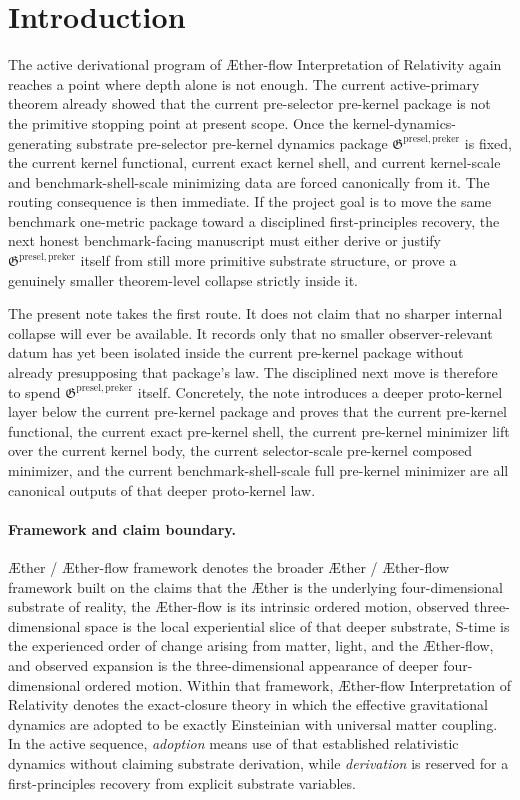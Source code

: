 \documentclass[11pt]{article}
\newcommand{\Aether}{\AE{}ther}
\newcommand{\Aflow}{\AE{}ther-flow}
\newcommand{\TheoryName}{\Aflow{} Interpretation of Relativity}
\newcommand{\TheoryProgram}{\Aether{} / \Aflow{} framework}
\newcommand{\PreKernelPackage}{\mathfrak G^{\mathrm{presel,preker}}}
\begin{document}
\section{Introduction}

The active derivational program of \TheoryName{} again reaches a point where depth alone is not enough. The current active-primary theorem already showed that the current pre-selector pre-kernel package is not the primitive stopping point at present scope. Once the kernel-dynamics-generating substrate pre-selector pre-kernel dynamics package \(\PreKernelPackage\) is fixed, the current kernel functional, current exact kernel shell, and current kernel-scale and benchmark-shell-scale minimizing data are forced canonically from it. The routing consequence is then immediate. If the project goal is to move the same benchmark one-metric package toward a disciplined first-principles recovery, the next honest benchmark-facing manuscript must either derive or justify \(\PreKernelPackage\) itself from still more primitive substrate structure, or prove a genuinely smaller theorem-level collapse strictly inside it.

The present note takes the first route. It does not claim that no sharper internal collapse will ever be available. It records only that no smaller observer-relevant datum has yet been isolated inside the current pre-kernel package without already presupposing that package's law. The disciplined next move is therefore to spend \(\PreKernelPackage\) itself. Concretely, the note introduces a deeper proto-kernel layer below the current pre-kernel package and proves that the current pre-kernel functional, the current exact pre-kernel shell, the current pre-kernel minimizer lift over the current kernel body, the current selector-scale pre-kernel composed minimizer, and the current benchmark-shell-scale full pre-kernel minimizer are all canonical outputs of that deeper proto-kernel law.

\paragraph{Framework and claim boundary.}
\TheoryProgram{} denotes the broader \Aether{} / \Aflow{} framework built on the claims that the \Aether{} is the underlying four-dimensional substrate of reality, the \Aflow{} is its intrinsic ordered motion, observed three-dimensional space is the local experiential slice of that deeper substrate, S-time is the experienced order of change arising from matter, light, and the \Aflow{}, and observed expansion is the three-dimensional appearance of deeper four-dimensional ordered motion. Within that framework, \TheoryName{} denotes the exact-closure theory in which the effective gravitational dynamics are adopted to be exactly Einsteinian with universal matter coupling. In the active sequence, \emph{adoption} means use of that established relativistic dynamics without claiming substrate derivation, while \emph{derivation} is reserved for a first-principles recovery from explicit substrate variables.
\end{document}
